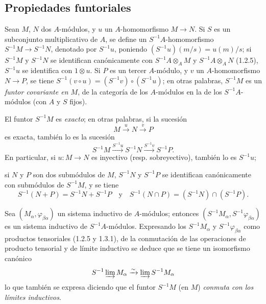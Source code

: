 \subsection{Propiedades funtoriales}
\label{subsection:0.1.3-fr}

\begin{env}[1.3.1]
\label{0.1.3.1-fr}
Sean $M$, $N$ dos $A$-módulos, y $u$ un $A$-homomorfismo $M\to N$.
Si $S$ es un subconjunto multiplicativo de $A$, se define un $S^{-1}A$-homomorfismo $S^{-1}M\to S^{-1}N$, denotado por $S^{-1}u$, poniendo $(S^{-1}u)(m/s)=u(m)/s$; si $S^{-1}M$ y $S^{-1}N$ se identifican canónicamente con $S^{-1}A\otimes_A M$ y $S^{-1}A\otimes_A N$ (1.2.5), $S^{-1}u$ se identifica con $1\otimes u$.
Si $P$ es un tercer $A$-módulo, y $v$ un $A$-homomorfismo $N\to P$, se tiene $S^{-1}(v\circ u)=(S^{-1}v)\circ(S^{-1}u)$; en otras palabras, $S^{-1}M$ es un \emph{funtor covariante en $M$}, de la categoría de los $A$-módulos en la de los $S^{-1}A$-módulos (con $A$ y $S$ fijos).
\end{env}

\begin{env}[1.3.2]
\label{0.1.3.2-fr}
El funtor $S^{-1}M$ es \emph{exacto}; en otras palabras, si la sucesión
\[
  M\xrightarrow{u}N\xrightarrow{v}P
\]
es exacta, también lo es la sucesión
\[
  S^{-1}M\xrightarrow{S^{-1}u}S^{-1}N\xrightarrow{S^{-1}v}S^{-1}P.
\]
En particular, si $u:M\to N$ es inyectivo (resp. sobreyectivo), también lo es $S^{-1}u$;

si $N$ y $P$ son dos submódulos de $M$, $S^{-1}N$ y $S^{-1}P$ se identifican canónicamente con submódulos de $S^{-1}M$, y se tiene
\[
  S^{-1}(N+P)=S^{-1}N+S^{-1}P
  \quad\text{y}\quad
  S^{-1}(N\cap P)=(S^{-1}N)\cap(S^{-1}P).
\]
\end{env}

\begin{env}[1.3.3]
\label{0.1.3.3-fr}
Sea $(M_\alpha,\varphi_{\beta\alpha})$ un sistema inductivo de $A$-módulos; entonces $(S^{-1}M_\alpha,S^{-1}\varphi_{\beta\alpha})$ es un sistema inductivo de $S^{-1}A$-módulos.
Expresando los $S^{-1}M_\alpha$ y $S^{-1}\varphi_{\beta\alpha}$ como productos tensoriales (1.2.5 y 1.3.1), de la conmutación de las operaciones de producto tensorial y de límite inductivo se deduce que se tiene un isomorfismo canónico
\[
  S^{-1}\varinjlim M_\alpha\xrightarrow{\sim}\varinjlim S^{-1}M_\alpha
\]
lo que también se expresa diciendo que el funtor $S^{-1}M$ (en $M$) \emph{conmuta con los límites inductivos}.
\end{env}

